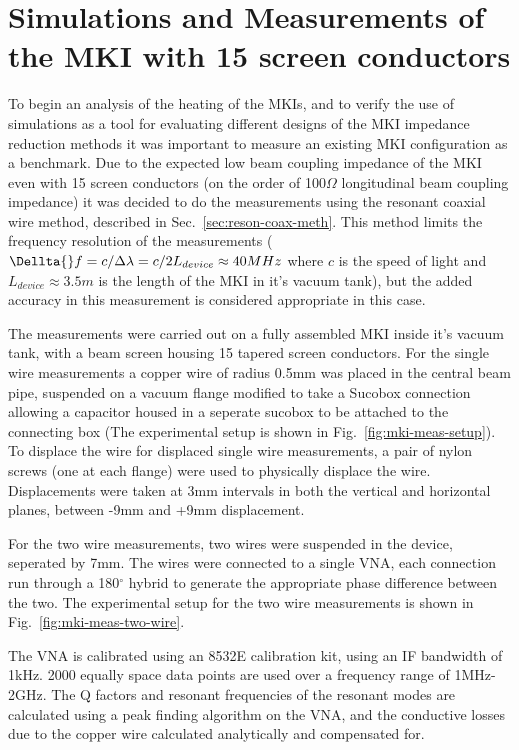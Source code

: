 \section{Simulations and Measurements of the MKI with 15 screen conductors}

To begin an analysis of the heating of the MKIs, and to verify the use of simulations as a tool for evaluating different designs of the MKI impedance reduction methods it was important to measure an existing MKI configuration as a benchmark. Due to the expected low beam coupling impedance of the MKI even with 15 screen conductors (on the order of 100$\Omega$ longitudinal beam coupling impedance) it was decided to do the measurements using the resonant coaxial wire method, described in Sec.~\ref{sec:reson-coax-meth}. This method limits the frequency resolution of the measurements ($\Dellta{}f = c/\Delta \lambda = c/2L_{device} \approx 40MHz$ where $c$ is the speed of light and $L_{device}\approx 3.5m$ is the length of the MKI in it's vacuum tank), but the added accuracy in this measurement is considered appropriate in this case.

The measurements were carried out on a fully assembled MKI inside it's vacuum tank, with a beam screen housing 15 tapered screen conductors. For the single wire measurements a copper wire of radius 0.5mm was placed in the central beam pipe, suspended on a vacuum flange modified to take a Sucobox connection allowing a capacitor housed in a seperate sucobox to be attached to the connecting box (The experimental setup is shown in Fig.~\ref{fig:mki-meas-setup}). To displace the wire for displaced single wire measurements, a pair of nylon screws (one at each flange) were used to physically displace the wire. Displacements were taken at 3mm intervals in both the vertical and horizontal planes, between -9mm and +9mm displacement.

For the two wire measurements, two wires were suspended in the device, seperated by 7mm. The wires were connected to a single VNA, each connection run through a 180$^{\circ}$ hybrid to generate the appropriate phase difference between the two. The experimental setup for the two wire measurements is shown in Fig.~\ref{fig:mki-meas-two-wire}.

The VNA is calibrated using an 8532E calibration kit, using an IF bandwidth of 1kHz. 2000 equally space data points are used over a frequency range of 1MHz-2GHz. The Q factors and resonant frequencies of the resonant modes are calculated using a peak finding algorithm on the VNA, and the conductive losses due to the copper wire calculated analytically and compensated for.

